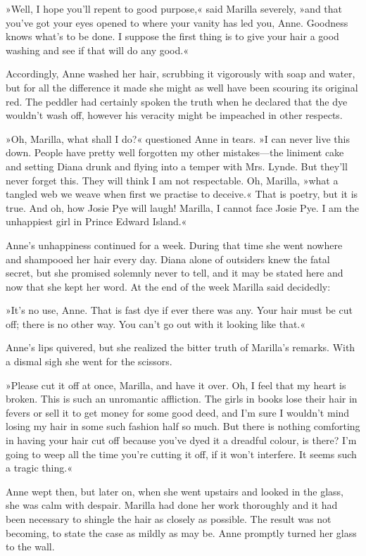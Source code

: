 »Well, I hope you’ll repent to good purpose,« said Marilla severely, »and that you’ve got your eyes opened to where your vanity has led you, Anne. Goodness knows what’s to be done. I suppose the first thing is to give your hair a good washing and see if that will do any good.«

Accordingly, Anne washed her hair, scrubbing it vigorously with soap and water, but for all the difference it made she might as well have been scouring its original red. The peddler had certainly spoken the truth when he declared that the dye wouldn’t wash off, however his veracity might be impeached in other respects.

»Oh, Marilla, what shall I do?« questioned Anne in tears. »I can never live this down. People have pretty well forgotten my other mistakes—the liniment cake and setting Diana drunk and flying into a temper with Mrs. Lynde. But they’ll never forget this. They will think I am not respectable. Oh, Marilla, »what a tangled web we weave when first we practise to deceive.« That is poetry, but it is true. And oh, how Josie Pye will laugh! Marilla, I cannot face Josie Pye. I am the unhappiest girl in Prince Edward Island.«

Anne’s unhappiness continued for a week. During that time she went nowhere and shampooed her hair every day. Diana alone of outsiders knew the fatal secret, but she promised solemnly never to tell, and it may be stated here and now that she kept her word. At the end of the week Marilla said decidedly:

»It’s no use, Anne. That is fast dye if ever there was any. Your hair must be cut off; there is no other way. You can’t go out with it looking like that.«

Anne’s lips quivered, but she realized the bitter truth of Marilla’s remarks. With a dismal sigh she went for the scissors.

»Please cut it off at once, Marilla, and have it over. Oh, I feel that my heart is broken. This is such an unromantic affliction. The girls in books lose their hair in fevers or sell it to get money for some good deed, and I’m sure I wouldn’t mind losing my hair in some such fashion half so much. But there is nothing comforting in having your hair cut off because you’ve dyed it a dreadful colour, is there? I’m going to weep all the time you’re cutting it off, if it won’t interfere. It seems such a tragic thing.«

Anne wept then, but later on, when she went upstairs and looked in the glass, she was calm with despair. Marilla had done her work thoroughly and it had been necessary to shingle the hair as closely as possible. The result was not becoming, to state the case as mildly as may be. Anne promptly turned her glass to the wall.

